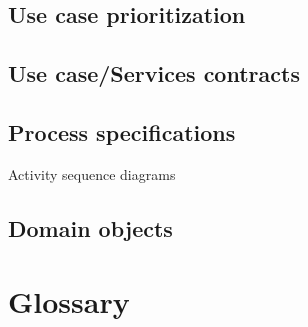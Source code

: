 \documentclass[10pt,a4paper]{article}
\begin{document}
\subsection{Use case prioritization}
\subsection{Use case/Services contracts}
\subsection{Process specifications}
Activity sequence diagrams
\subsection{Domain objects}
\section{Glossary}
\end{document}
